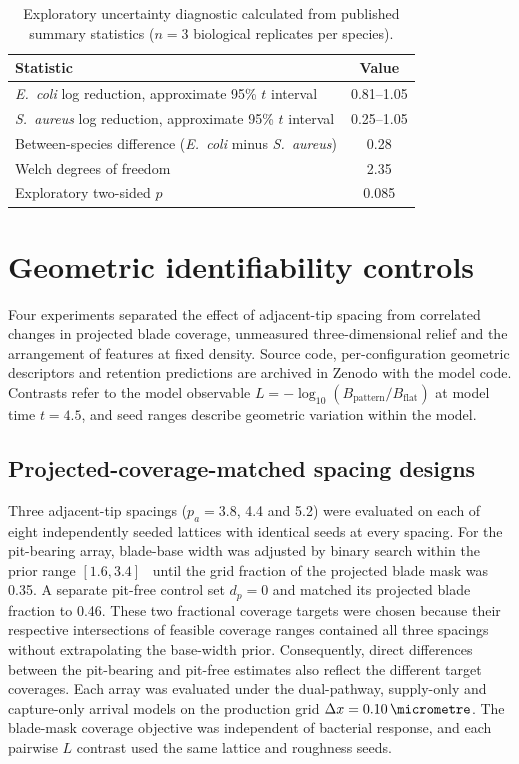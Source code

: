 \documentclass[11pt]{article}
\newcommand{\Ec}{\textit{E.~coli}}
\newcommand{\Sa}{\textit{S.~aureus}}
\begin{document}
\begin{table}[htbp]\centering\small
\caption{Exploratory uncertainty diagnostic calculated from published summary statistics ($n=3$ biological replicates per species).}
\label{tab:smalln}
\begin{tabular}{lc}\toprule
Statistic & Value\\\midrule
\Ec{} log reduction, approximate 95\% $t$ interval & 0.81--1.05\\
\Sa{} log reduction, approximate 95\% $t$ interval & 0.25--1.05\\
Between-species difference (\Ec{} minus \Sa{}) & 0.28\\
Welch degrees of freedom & 2.35\\
Exploratory two-sided $p$ & 0.085\\
\bottomrule\end{tabular}
\end{table}

\FloatBarrier
\section{Geometric identifiability controls}
Four experiments separated the effect of adjacent-tip spacing from correlated changes in projected blade coverage, unmeasured three-dimensional relief and the arrangement of features at fixed density. Source code, per-configuration geometric descriptors and retention predictions are archived in Zenodo with the model code. Contrasts refer to the model observable $L=-\log_{10}(B_{\mathrm{pattern}}/B_{\mathrm{flat}})$ at model time $t=4.5$, and seed ranges describe geometric variation within the model.

\subsection{Projected-coverage-matched spacing designs}
Three adjacent-tip spacings ($p_a=3.8$, 4.4 and \SI{5.2}{\micrometre}) were evaluated on each of eight independently seeded lattices with identical seeds at every spacing. For the pit-bearing array, blade-base width was adjusted by binary search within the prior range $[1.6,3.4]$~\si{\micrometre} until the grid fraction of the projected blade mask was 0.35. A separate pit-free control set $d_p=0$ and matched its projected blade fraction to 0.46. These two fractional coverage targets were chosen because their respective intersections of feasible coverage ranges contained all three spacings without extrapolating the base-width prior. Consequently, direct differences between the pit-bearing and pit-free estimates also reflect the different target coverages. Each array was evaluated under the dual-pathway, supply-only and capture-only arrival models on the production grid $\Delta x=\SI{0.10}{\micrometre}$. The blade-mask coverage objective was independent of bacterial response, and each pairwise $L$ contrast used the same lattice and roughness seeds.
\end{document}
